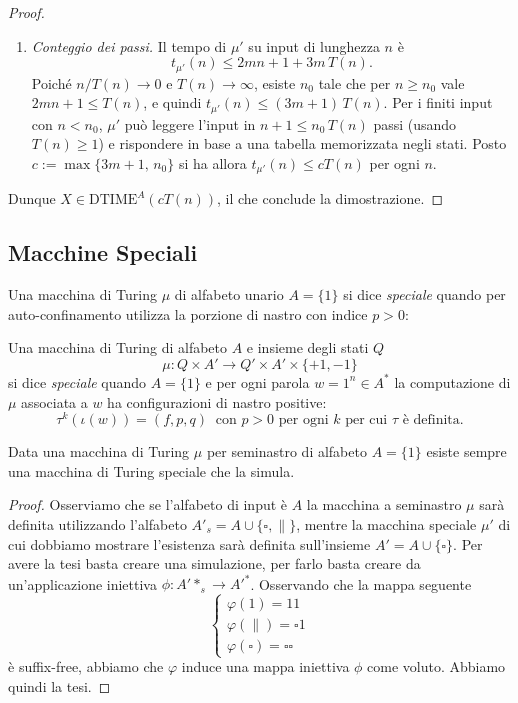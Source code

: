 \begin{proof}
\begin{enumerate}
    \item[3.] \emph{Conteggio dei passi.} Il tempo di $\mu'$ su input di lunghezza $n$ è
    \[
    t_{\mu'}(n)\le 2mn+1+3m\,T(n).
    \]
    Poiché $n/T(n)\to0$ e $T(n)\to\infty$, esiste $n_0$ tale che per $n\ge n_0$ vale
    $2mn+1\le T(n)$, e quindi $t_{\mu'}(n)\le(3m+1)\,T(n)$. Per i finiti input con $n<n_0$,
    $\mu'$ può leggere l'input in $n+1\le n_0\,T(n)$ passi (usando $T(n)\ge1$) e rispondere
    in base a una tabella memorizzata negli stati. Posto $c:=\max\{3m+1,\,n_0\}$ si ha allora
    $t_{\mu'}(n)\le cT(n)$ per ogni $n$.
\end{enumerate}
Dunque $X\in\mathrm{DTIME}^A(cT(n))$, il che conclude la dimostrazione.
\end{proof}


\subsection{Macchine Speciali}


Una macchina di Turing $\mu$ di alfabeto unario $A=\{1\}$ si dice \emph{speciale} quando per auto-confinamento utilizza la porzione di nastro con indice $p>0$:

\begin{defi}
Una macchina di Turing di alfabeto $A$ e insieme degli stati $Q$
\[
\mu: Q\times A'\to Q'\times A'\times\{+1,-1\}
\]
si dice \emph{speciale} quando $A=\{1\}$ e per ogni parola $w=1^n\in A^*$ la computazione di $\mu$ associata a $w$ ha configurazioni di nastro positive:
\[
\tau^k(\iota(w))=(f,p,q)\ \text{ con } p>0 \text{ per ogni } k \text{ per cui } \tau \text{ è definita.}
\]
\end{defi}

\begin{prop}\label{prop:speciale}
Data una macchina di Turing $\mu$ per seminastro di alfabeto $A=\{1\}$ esiste sempre una macchina di Turing speciale che la simula.
\begin{proof}
Osserviamo che se l'alfabeto di input è $A$ la macchina a seminastro $\mu$ sarà definita utilizzando l'alfabeto $A'_s=A\cup\{\square,\|\}$, mentre la macchina speciale $\mu'$ di cui dobbiamo mostrare l'esistenza sarà definita sull'insieme $A'=A\cup\{\square\}$.
Per avere la tesi basta creare una simulazione, 
per farlo basta creare da un'applicazione iniettiva $\phi:A'*_s\to A'^*$.
Osservando che la mappa seguente
\[
\begin{cases}
\varphi(1)=11\\
\varphi(\|)=\square 1\\
\varphi(\square)=\square\square
\end{cases}
\]
è suffix-free, abbiamo che $\varphi$ induce una mappa iniettiva
$\phi$ come voluto. Abbiamo quindi la tesi.
\end{proof}
\end{prop}

